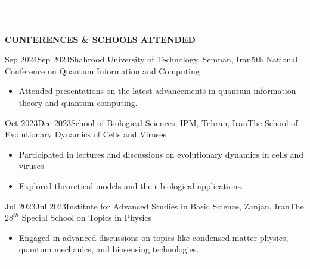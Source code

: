 \documentclass[11pt, b4paper]{cv}
\begin{document}
\vspace{-0.15in}
\rule{\textwidth}{1pt}\\
\vspace{-0.15in}

\textbf{CONFERENCES \& SCHOOLS ATTENDED}

\begin{school}{Sep 2024}{Sep 2024}{Shahrood University of Technology, Semnan, Iran}{5th National Conference on Quantum Information and Computing}
	\begin{itemize}
	    \item Attended presentations on the latest advancements in quantum information theory and quantum computing.
	\end{itemize}
\end{school}
\vspace{-0.1in}

\begin{school}{Oct 2023}{Dec 2023}{School of Biological Sciences, IPM, Tehran, Iran}{The School of Evolutionary Dynamics of Cells and Viruses}
	\begin{itemize}
	    \item Participated in lectures and discussions on evolutionary dynamics in cells and viruses.
	    \item Explored theoretical models and their biological applications.
	\end{itemize}
\end{school}
\vspace{-0.1in}

\begin{school}{Jul 2023}{Jul 2023}{Institute for Advanced Studies in Basic Science, Zanjan, Iran}{The $28^{th}$ Special School on Topics in Physics}
	\begin{itemize}
	    \item Engaged in advanced discussions on topics like condensed matter physics, quantum mechanics, and biosensing technologies.
	\end{itemize}
\end{school}



\vspace{-0.15in}
\rule{\textwidth}{1pt}\\
\vspace{-0.15in}
\end{document}

